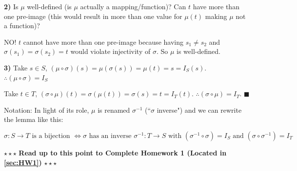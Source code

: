 \begin{lemma}
\noindent\textbf{2)} Is $\mu$ well-defined (is $\mu$ actually a mapping/function)? Can $t$ have more
than one pre-image (this would result in more than one value for $\mu(t)$ making $\mu$ not a
function)?\steezybreak

\noindent NO! $t$ cannot have more than one pre-image because having $s_1\neq s_2$ and
$\sigma(s_1)=\sigma(s_2)=t$ would violate injectivity of $\sigma$. So $\mu$ is
well-defined.\steezybreak

\noindent\textbf{3)} Take $s\in S$, $(\mu\circ \sigma)(s)=\mu(\sigma(s))=\mu(t)=s=I_S(s)$.
$\therefore (\mu\circ \sigma)= I_S$\steezybreak

\noindent Take $t\in T$, $(\sigma\circ \mu)(t)= \sigma(\mu(t))=\sigma(s)=t=I_T(t)$.
$\therefore (\sigma\circ \mu) = I_T$. $\blacksquare$ \steezybreak

\noindent Notation: In light of its role, $\mu$ is renamed $\sigma^{-1}$ (``$\sigma$ inverse") and
we can rewrite the lemma like this:

\begin{equation}
    \sigma:S\rightarrow T \text{ is a bijection } \iff \sigma \text{ has an inverse } \sigma^{-1}: T\rightarrow S \text{ with } (\sigma^{-1}\circ \sigma)= I_S \text{ and } (\sigma \circ \sigma^{-1})=I_T\nonumber
\end{equation}
\end{lemma}\steezybreak
\begin{tcolorbox}
\begin{center}
    $\star\star\star$ \textbf{Read up to this point to Complete Homework 1 (Located in
    \ref{sec:HW1})} $\star\star\star$
\end{center}
\end{tcolorbox}
\steezybreak


